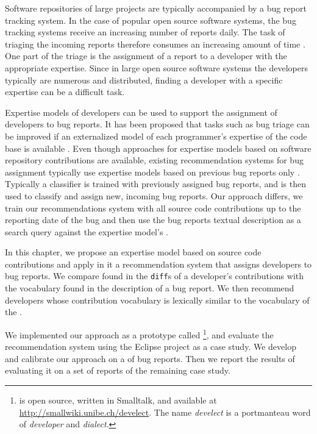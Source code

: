 \documentclass[10pt]{book}
\begin{document}
Software repositories of large projects are typically accompanied by a bug report tracking system. In the case of popular open source software systems, the bug tracking systems receive an increasing number of reports daily. The task of triaging the incoming reports therefore consumes an increasing amount of time \cite{Anvi06b}. One part of the triage is the assignment of a report to a developer with the appropriate expertise. Since in large open source software systems the developers typically are numerous and distributed, finding a developer with a specific expertise can be a difficult task.

Expertise models of developers can be used to support the assignment of developers to bug reports. It has been proposed that tasks such as bug triage can be improved if an externalized model of each programmer's expertise of the code base is available \cite{Frit07a}. Even though approaches for expertise models based on software repository contributions are available, existing recommendation systems for bug assignment typically use expertise models based on previous bug reports only \cite{Anvi06a,Canf05a,Cubr04b,Mock02b,Lucc02a}.
Typically a classifier is trained with previously assigned bug reports, and is then used to classify and assign new, incoming bug reports.
Our approach differs, we train our recommendations system with all source code contributions up to the reporting date of the bug and then use the bug reports textual description as a search query against the expertise model's \TAM.

In this chapter, we propose an expertise model based on source code contributions and apply in it a recommendation system that assigns developers to bug reports. We compare \VOC found in the \verb$diff$s of a developer's contributions with the vocabulary found in the description of a bug report. We then recommend developers whose contribution vocabulary is lexically similar to the vocabulary of the \BR.

We implemented our approach as a prototype called \DEVLECT\footnote{\DEVLECT is open source, written in Smalltalk, and available at \url{http://smallwiki.unibe.ch/develect}. The name \emph{develect} is a portmanteau word of \emph{developer} and \emph{dialect}. }, and evaluate the recommendation system using the Eclipse project as a case study. We develop and calibrate our approach on a \trainingset of bug reports. Then we report the results of evaluating it on a set of reports of the remaining case study.
\end{document}
